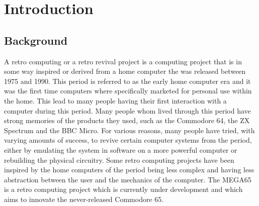 \chapter{Introduction} %
\label{Chapter1} %

\section{Background}
A retro computing or a retro revival project is a computing project that is in some way inspired or derived from a home computer the was released between 1975 and 1990. This period is referred to as the early home computer era and it was the first time computers where specifically marketed for personal use within the home. This lead to many people having their first interaction with a computer during this period. Many people whom lived through this period have strong memories of the products they used, such as the Commodore 64, the ZX Spectrum and the BBC Micro. For various reasons, many people have tried, with varying amounts of success, to revive certain computer systems from the period, either by emulating the system in software on a more powerful computer or rebuilding the physical circuitry. Some retro computing projects have been inspired by the home computers of the period being less complex and having less abstraction between the user and the mechanics of the computer. The MEGA65 is a retro computing project which is currently under development and which aims to innovate the never-released Commodore 65. 


